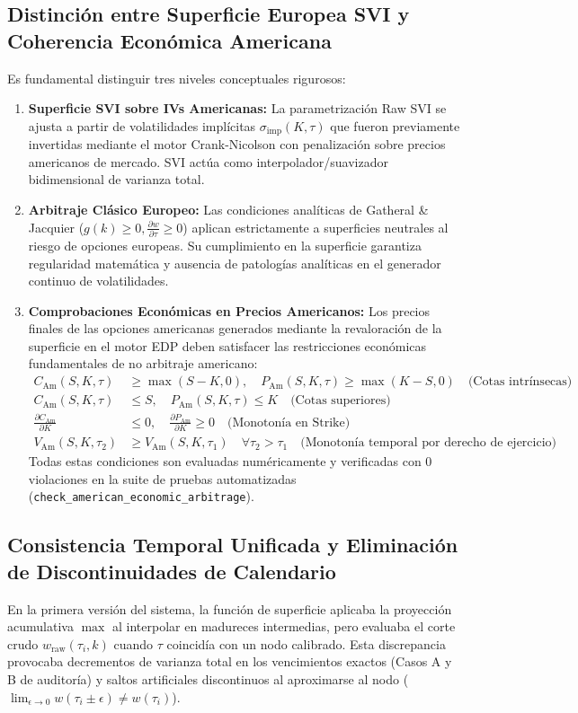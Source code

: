 \documentclass[11pt,a4paper]{article}
\begin{document}
\subsection{Distinción entre Superficie Europea SVI y Coherencia Económica Americana}
Es fundamental distinguir tres niveles conceptuales rigurosos:
\begin{enumerate}
    \item \textbf{Superficie SVI sobre IVs Americanas:} La parametrización Raw SVI se ajusta a partir de volatilidades implícitas $\sigma_{\text{imp}}(K, \tau)$ que fueron previamente invertidas mediante el motor Crank-Nicolson con penalización sobre precios americanos de mercado. SVI actúa como interpolador/suavizador bidimensional de varianza total.
    \item \textbf{Arbitraje Clásico Europeo:} Las condiciones analíticas de Gatheral \& Jacquier ($g(k) \ge 0, \frac{\partial w}{\partial \tau} \ge 0$) aplican estrictamente a superficies neutrales al riesgo de opciones europeas. Su cumplimiento en la superficie garantiza regularidad matemática y ausencia de patologías analíticas en el generador continuo de volatilidades.
    \item \textbf{Comprobaciones Económicas en Precios Americanos:} Los precios finales de las opciones americanas generados mediante la revaloración de la superficie en el motor EDP deben satisfacer las restricciones económicas fundamentales de no arbitraje americano:
    \begin{align}
        C_{\text{Am}}(S, K, \tau) &\ge \max(S - K, 0), \quad P_{\text{Am}}(S, K, \tau) \ge \max(K - S, 0) \quad \text{(Cotas intrínsecas)} \\
        C_{\text{Am}}(S, K, \tau) &\le S, \quad P_{\text{Am}}(S, K, \tau) \le K \quad \text{(Cotas superiores)} \\
        \frac{\partial C_{\text{Am}}}{\partial K} &\le 0, \quad \frac{\partial P_{\text{Am}}}{\partial K} \ge 0 \quad \text{(Monotonía en Strike)} \\
        V_{\text{Am}}(S, K, \tau_2) &\ge V_{\text{Am}}(S, K, \tau_1) \quad \forall \tau_2 > \tau_1 \quad \text{(Monotonía temporal por derecho de ejercicio)}
    \end{align}
    Todas estas condiciones son evaluadas numéricamente y verificadas con 0 violaciones en la suite de pruebas automatizadas (\texttt{check\_american\_economic\_arbitrage}).
\end{enumerate}

\subsection{Consistencia Temporal Unificada y Eliminación de Discontinuidades de Calendario}
En la primera versión del sistema, la función de superficie aplicaba la proyección acumulativa $\max$ al interpolar en madureces intermedias, pero evaluaba el corte crudo $w_{\text{raw}}(\tau_i, k)$ cuando $\tau$ coincidía con un nodo calibrado. Esta discrepancia provocaba decrementos de varianza total en los vencimientos exactos (Casos A y B de auditoría) y saltos artificiales discontinuos al aproximarse al nodo ($\lim_{\epsilon \to 0} w(\tau_i \pm \epsilon) \neq w(\tau_i)$).
\end{document}
